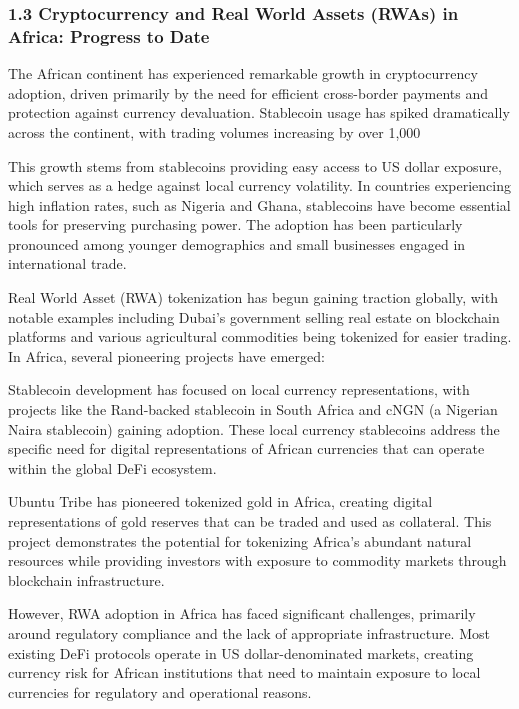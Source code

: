\documentclass[12pt]{article}
\begin{document}
\subsubsection{1.3 Cryptocurrency and Real World Assets (RWAs) in Africa: Progress to Date} %

The African continent has experienced remarkable growth in cryptocurrency adoption, driven primarily by the need for efficient cross-border payments and protection against currency devaluation. Stablecoin usage has spiked dramatically across the continent, with trading volumes increasing by over 1,000%

This growth stems from stablecoins providing easy access to US dollar exposure, which serves as a hedge against local currency volatility. In countries experiencing high inflation rates, such as Nigeria and Ghana, stablecoins have become essential tools for preserving purchasing power. The adoption has been particularly pronounced among younger demographics and small businesses engaged in international trade.

Real World Asset (RWA) tokenization has begun gaining traction globally, with notable examples including Dubai's government selling real estate on blockchain platforms and various agricultural commodities being tokenized for easier trading. In Africa, several pioneering projects have emerged:

Stablecoin development has focused on local currency representations, with projects like the Rand-backed stablecoin in South Africa and cNGN (a Nigerian Naira stablecoin) gaining adoption. These local currency stablecoins address the specific need for digital representations of African currencies that can operate within the global DeFi ecosystem.

Ubuntu Tribe has pioneered tokenized gold in Africa, creating digital representations of gold reserves that can be traded and used as collateral. This project demonstrates the potential for tokenizing Africa's abundant natural resources while providing investors with exposure to commodity markets through blockchain infrastructure.

However, RWA adoption in Africa has faced significant challenges, primarily around regulatory compliance and the lack of appropriate infrastructure. Most existing DeFi protocols operate in US dollar-denominated markets, creating currency risk for African institutions that need to maintain exposure to local currencies for regulatory and operational reasons.
\end{document}
